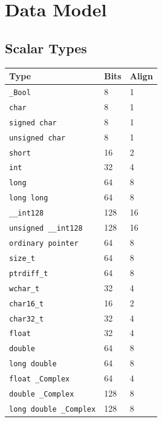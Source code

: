 \documentclass[10pt,twoside]{article}
\begin{document}
\clearpage
\section{Data Model}\label{page:data-model}
\subsection{Scalar Types}
\begingroup\footnotesize
\setlength{\tabcolsep}{2pt}
\begin{longtable}{@{}p{2.1in}p{1.0in}p{1.0in}@{}}
\toprule
\textbf{Type} & \textbf{Bits} & \textbf{Align}\\
\midrule
\endhead
\texttt{\_\allowbreak{}Bool} & 8 & 1\\
\texttt{char} & 8 & 1\\
\texttt{signed char} & 8 & 1\\
\texttt{unsigned char} & 8 & 1\\
\texttt{short} & 16 & 2\\
\texttt{int} & 32 & 4\\
\texttt{long} & 64 & 8\\
\texttt{long long} & 64 & 8\\
\texttt{\_\allowbreak{}\_\allowbreak{}int128} & 128 & 16\\
\texttt{unsigned \_\allowbreak{}\_\allowbreak{}int128} & 128 & 16\\
\texttt{ordinary pointer} & 64 & 8\\
\texttt{size\_\allowbreak{}t} & 64 & 8\\
\texttt{ptrdiff\_\allowbreak{}t} & 64 & 8\\
\texttt{wchar\_\allowbreak{}t} & 32 & 4\\
\texttt{char16\_\allowbreak{}t} & 16 & 2\\
\texttt{char32\_\allowbreak{}t} & 32 & 4\\
\texttt{float} & 32 & 4\\
\texttt{double} & 64 & 8\\
\texttt{long double} & 64 & 8\\
\texttt{float \_Complex} & 64 & 4\\
\texttt{double \_Complex} & 128 & 8\\
\texttt{long double \_Complex} & 128 & 8\\
\bottomrule
\end{longtable}
\endgroup
\end{document}
